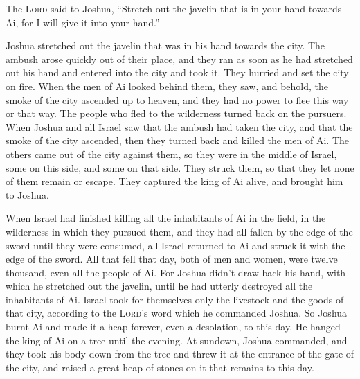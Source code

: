  The \textsc{Lord} said to Joshua, ``Stretch out the
javelin that is in your hand towards Ai, for I will give it into your
hand.''

Joshua stretched out the javelin that was in his hand towards the city.
 The ambush arose quickly out of their place, and they
ran as soon as he had stretched out his hand and entered into the city
and took it. They hurried and set the city on fire.  When
the men of Ai looked behind them, they saw, and behold, the smoke of the
city ascended up to heaven, and they had no power to flee this way or
that way. The people who fled to the wilderness turned back on the
pursuers.  When Joshua and all Israel saw that the ambush
had taken the city, and that the smoke of the city ascended, then they
turned back and killed the men of Ai.  The others came
out of the city against them, so they were in the middle of Israel, some
on this side, and some on that side. They struck them, so that they let
none of them remain or escape.  They captured the king of
Ai alive, and brought him to Joshua.

 When Israel had finished killing all the inhabitants of
Ai in the field, in the wilderness in which they pursued them, and they
had all fallen by the edge of the sword until they were consumed, all
Israel returned to Ai and struck it with the edge of the sword.
 All that fell that day, both of men and women, were
twelve thousand, even all the people of Ai.  For Joshua
didn't draw back his hand, with which he stretched out the javelin,
until he had utterly destroyed all the inhabitants of Ai.
 Israel took for themselves only the livestock and the
goods of that city, according to the \textsc{Lord}'s word which he
commanded Joshua.  So Joshua burnt Ai and made it a heap
forever, even a desolation, to this day.  He hanged the
king of Ai on a tree until the evening. At sundown, Joshua commanded,
and they took his body down from the tree and threw it at the entrance
of the gate of the city, and raised a great heap of stones on it that
remains to this day.

